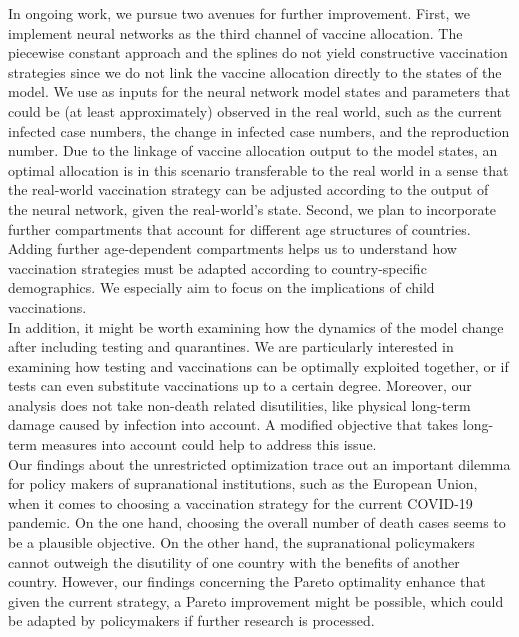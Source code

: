 In ongoing work, we pursue two avenues for further improvement. First, we implement neural networks as the third channel of vaccine allocation. The piecewise constant approach and the splines do not yield constructive vaccination strategies since we do not link the vaccine allocation directly to the states of the model. We use as inputs for the neural network model states and parameters that could be (at least approximately) observed in the real world, such as the current infected case numbers, the change in infected case numbers, and the reproduction number. Due to the linkage of vaccine allocation output to the model states, an optimal allocation is in this scenario transferable to the real world in a sense that the real-world vaccination strategy can be adjusted according to the output of the neural network, given the real-world's state. Second, we plan to incorporate further compartments that account for different age structures of countries. Adding further age-dependent compartments helps us to understand how vaccination strategies must be adapted according to country-specific demographics. We especially aim to focus on the implications of child vaccinations.  \\




In addition, it might be worth examining how the dynamics of the model change after including testing and quarantines. We are particularly interested in examining how testing and vaccinations can be optimally exploited together, or if tests can even substitute vaccinations up to a certain degree. Moreover, our analysis does not take non-death related disutilities, like physical long-term damage caused by infection into account. A modified objective that takes long-term measures into account could help to address this issue. \\




Our findings about the unrestricted optimization trace out an important dilemma for policy makers of supranational institutions, such as the European Union, when it comes to choosing a vaccination strategy for the current COVID-19 pandemic. On the one hand, choosing the overall number of death cases seems to be a plausible objective. On the other hand, the supranational policymakers cannot outweigh the disutility of one country with the benefits of another country. However, our findings concerning the Pareto optimality enhance that given the current strategy, a Pareto improvement might be possible, which could be adapted by policymakers if further research is processed. 


